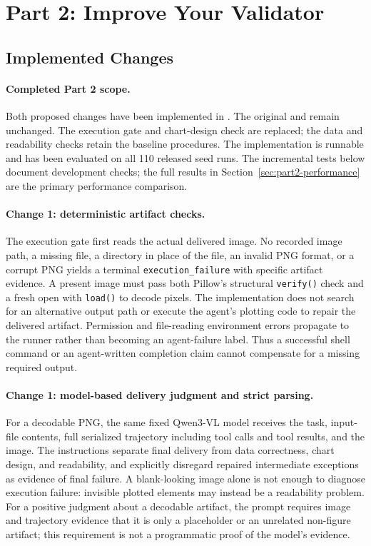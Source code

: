 \documentclass[11pt]{article}
\begin{document}
\clearpage
\section{Part 2: Improve Your Validator}

\subsection{Implemented Changes}

\paragraph{Completed Part 2 scope.}
Both proposed changes have been implemented in .
The original  and
 remain unchanged.
The execution gate and chart-design check are replaced; the data and
readability checks retain the baseline procedures. The implementation is
runnable and has been evaluated on all 110 released seed runs. The incremental
tests below document development checks; the full results in
Section~\ref{sec:part2-performance} are the primary performance comparison.

\paragraph{Change 1: deterministic artifact checks.}
The execution gate first reads the actual delivered image. No recorded image
path, a missing file, a directory in place of the file, an invalid PNG format,
or a corrupt PNG yields a terminal \texttt{execution\_failure} with specific
artifact evidence. A present image must pass both Pillow's structural
\texttt{verify()} check and a fresh open with \texttt{load()} to decode pixels.
The implementation does not search for an alternative output path or execute
the agent's plotting code to repair the delivered artifact.
Permission and file-reading environment errors propagate to the runner rather
than becoming an agent-failure label. Thus a successful shell command or an
agent-written completion claim cannot compensate for a missing required output.

\paragraph{Change 1: model-based delivery judgment and strict parsing.}
For a decodable PNG, the same fixed Qwen3-VL model receives the task, input-file
contents, full serialized trajectory including tool calls and tool results,
and the image. The instructions separate final delivery from data correctness,
chart design, and readability, and explicitly disregard repaired intermediate
exceptions as evidence of final failure. A blank-looking image alone is not
enough to diagnose execution failure: invisible plotted elements may instead
be a readability problem. For a positive judgment about a decodable artifact,
the prompt requires image and trajectory evidence that it is only a placeholder
or an unrelated non-figure artifact; this requirement is not a programmatic
proof of the model's evidence.
\end{document}
